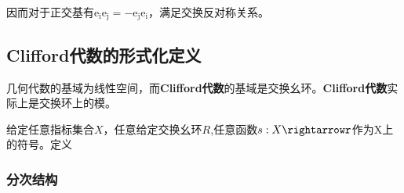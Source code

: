 因而对于正交基有$\mathrm{e_ie_j=-e_je_i}$，满足交换反对称关系。

\subsection{Clifford代数的形式化定义}
几何代数的基域为线性空间，而\textbf{Clifford代数}的基域是交换幺环。\textbf{Clifford代数}实际上是交换环上的模。
\begin{definition}{}
给定任意指标集合$X$，任意给定交换幺环$R$,任意函数$s:X\rightarrowr$作为X上的符号。定义

\end{definition}
\subsubsection{分次结构}

